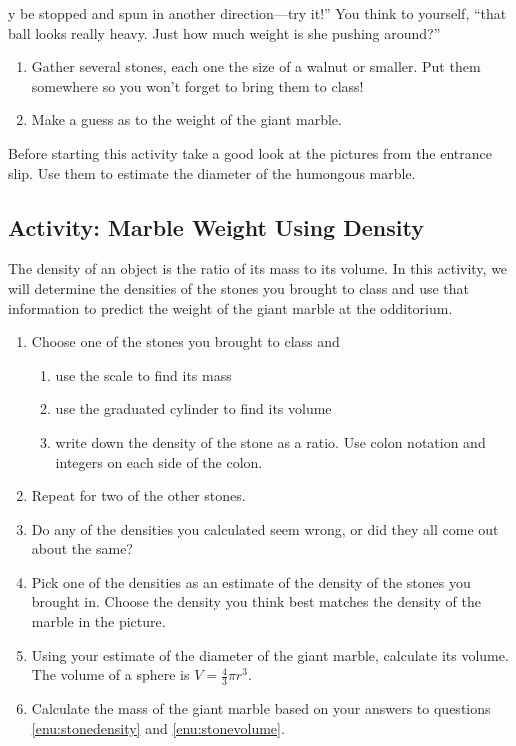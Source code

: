 y be stopped and spun in another direction---try it!'' You think to yourself, ``that ball looks really heavy. Just how much weight is she pushing around?''

\begin{enumerate}
    \item Gather several stones, each one the size of a walnut or smaller. Put them somewhere so you won't forget to bring them to class!\wbvfill
    \item Make a guess as to the weight of the giant marble.\wbvfill
\end{enumerate}

\wbnewpage
\noindent Before starting this activity take a good look at the pictures from the entrance slip. Use them to estimate the diameter of the humongous marble. 

\subsection{Activity: Marble Weight Using Density}
The density of an object is the ratio of its mass to its volume. In this activity, we will determine the densities of the stones you brought to class and use that information to predict the weight of the giant marble at the odditorium.
\begin{enumerate}
    \item Choose one of the stones you brought to class and
    \begin{enumerate}
        \item use the scale to find its mass\wbvfill
        \item use the graduated cylinder to find its volume\wbvfill
        \item write down the density of the stone as a ratio. Use colon notation and integers on each side of the colon.\wbvfill
    \end{enumerate}
    \item Repeat for two of the other stones.
    \item Do any of the densities you calculated seem wrong, or did they all come out about the same?\wbvfill
    \item \label{enu:stonedensity}Pick one of the densities as an estimate of the density of the stones you brought in. Choose the density you think best matches the density of the marble in the picture.\wbvfill
    \item \label{enu:stonevolume}Using your estimate of the diameter of the giant marble, calculate its volume. The volume of a sphere is $V=\frac43\pi r^3$.\wbvfill
    \item Calculate the mass of the giant marble based on your answers to questions \ref{enu:stonedensity} and \ref{enu:stonevolume}. \wbvfill
\end{enumerate}


